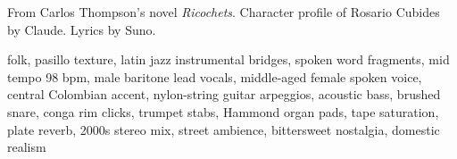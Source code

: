 
\begin{notes}
From Carlos Thompson's novel \emph{Ricochets}. Character profile of Rosario Cubides by Claude. Lyrics by Suno.
\end{notes}
\begin{style}
folk, pasillo texture, latin jazz instrumental bridges, spoken word fragments, mid tempo 98 bpm, male baritone lead vocals, middle-aged female spoken voice, central Colombian accent, nylon-string guitar arpeggios, acoustic bass, brushed snare, conga rim clicks, trumpet stabs, Hammond organ pads, tape saturation, plate reverb, 2000s stereo mix, street ambience, bittersweet nostalgia, domestic realism
\end{style}
